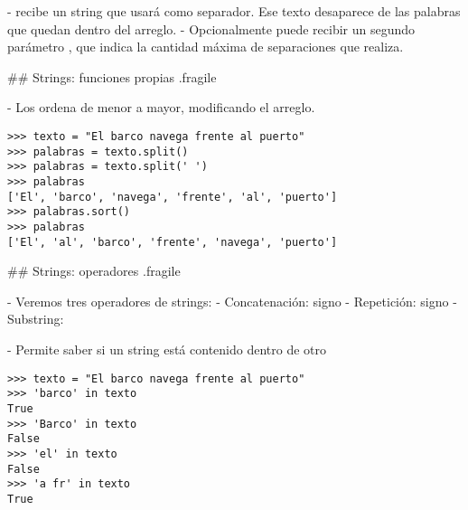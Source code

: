 -  recibe un string que usará como separador. Ese texto desaparece de las
palabras que quedan dentro del arreglo.
- Opcionalmente puede recibir un segundo parámetro , que indica la cantidad
máxima de separaciones que realiza.

## Strings: funciones propias {.fragile}


- Los ordena de menor a mayor, modificando el arreglo.

\begin{lstlisting}[style=frame03]
>>> texto = "El barco navega frente al puerto"
>>> palabras = texto.split()
>>> palabras = texto.split(' ')
>>> palabras
['El', 'barco', 'navega', 'frente', 'al', 'puerto']
>>> palabras.sort()
>>> palabras
['El', 'al', 'barco', 'frente', 'navega', 'puerto']
\end{lstlisting}

## Strings: operadores {.fragile}

- Veremos tres operadores de strings:
    - Concatenación: signo \ttt{+}
    - Repetición: signo \ttt{*}
    - Substring: 


- Permite saber si un string está contenido dentro de otro

\begin{lstlisting}[style=frame03]
>>> texto = "El barco navega frente al puerto"
>>> 'barco' in texto
True
>>> 'Barco' in texto
False
>>> 'el' in texto
False
>>> 'a fr' in texto
True
\end{lstlisting}

